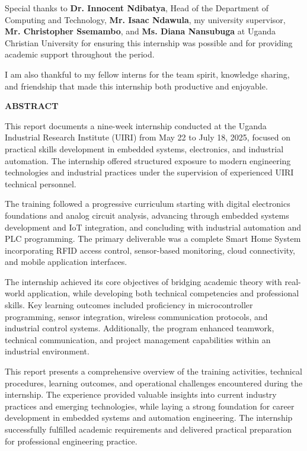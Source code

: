 \documentclass[12pt,a4paper]{report}
\begin{document}
\noindent Special thanks to \textbf{Dr. Innocent Ndibatya}, Head of the Department of Computing and Technology, \textbf{Mr. Isaac Ndawula}, my university supervisor, \textbf{Mr. Christopher Ssemambo}, and \textbf{Ms. Diana Nansubuga} at Uganda Christian University for ensuring this internship was possible and for providing academic support throughout the period.

\noindent I am also thankful to my fellow interns for the team spirit, knowledge sharing, and friendship that made this internship both productive and enjoyable.

\newpage
{\fontsize{14}{16.8}\selectfont\bfseries\centering ABSTRACT\par}
\vspace{10pt}
\noindent This report documents a nine-week internship conducted at the Uganda Industrial Research Institute (UIRI) from May 22 to July 18, 2025, focused on practical skills development in embedded systems, electronics, and industrial automation. The internship offered structured exposure to modern engineering technologies and industrial practices under the supervision of experienced UIRI technical personnel.

\noindent The training followed a progressive curriculum starting with digital electronics foundations and analog circuit analysis, advancing through embedded systems development and IoT integration, and concluding with industrial automation and PLC programming. The primary deliverable was a complete Smart Home System incorporating RFID access control, sensor-based monitoring, cloud connectivity, and mobile application interfaces.

\noindent The internship achieved its core objectives of bridging academic theory with real-world application, while developing both technical competencies and professional skills. Key learning outcomes included proficiency in microcontroller programming, sensor integration, wireless communication protocols, and industrial control systems. Additionally, the program enhanced teamwork, technical communication, and project management capabilities within an industrial environment.

\noindent This report presents a comprehensive overview of the training activities, technical procedures, learning outcomes, and operational challenges encountered during the internship. The experience provided valuable insights into current industry practices and emerging technologies, while laying a strong foundation for career development in embedded systems and automation engineering. The internship successfully fulfilled academic requirements and delivered practical preparation for professional engineering practice.
\end{document}
